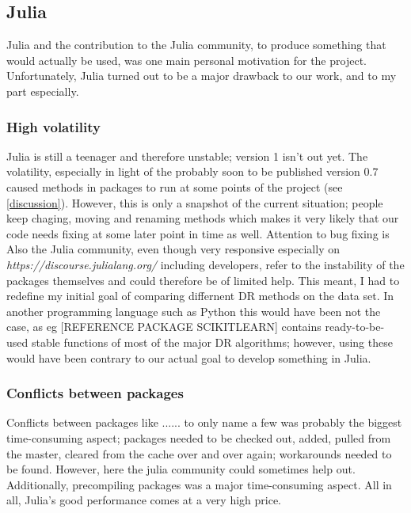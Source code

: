 \documentclass[journal, a4paper]{IEEEtran}
\begin{document}
\subsection{Julia}
Julia and the contribution to the Julia community, to produce something that would actually be used, was one main personal motivation for the project. Unfortunately, Julia turned out to be a major drawback to our work, and to my part especially.

\subsubsection{High volatility}
Julia is still a teenager and therefore unstable; version 1 isn't out yet. The volatility, especially in light of the probably soon to be published version 0.7
caused methods in packages to run at some points of the project (see \ref{discussion}). %
However, this is only a snapshot of the current situation; people keep chaging, moving and renaming methods which makes it very likely that our code needs fixing at some later point in time as well. Attention to bug fixing is 
Also the Julia community, even though very responsive especially on \textit{https://discourse.julialang.org/} including developers, refer to the instability of the packages themselves and could therefore be of limited help. %
This meant, I had to redefine my initial goal of comparing differnent DR methods on the data set.
In another programming language such as Python this would have been not the case, as eg [REFERENCE PACKAGE SCIKITLEARN] contains ready-to-be-used stable functions of most of the major DR algorithms; however, using these would have been contrary to our actual goal to develop something in Julia.

\subsubsection{Conflicts between packages}
Conflicts between packages like ...... to only name a few was probably the biggest time-consuming aspect; packages needed to be checked out, added, pulled from the master, cleared from the cache over and over again; workarounds needed to be found. 
However, here the julia community could sometimes help out.
Additionally, precompiling packages was a major time-consuming aspect. All in all, Julia's good performance comes at a very high price.
\end{document}
